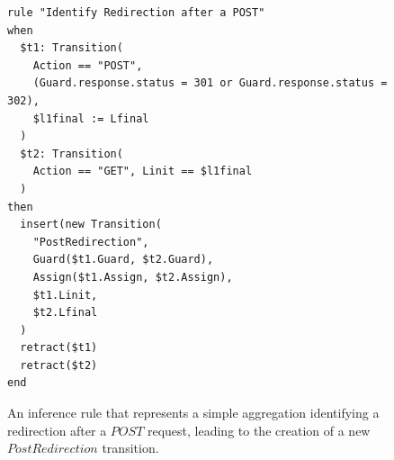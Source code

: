 \begin{figure}
\begin{framed}
\begin{BVerbatim}
rule "Identify Redirection after a POST"
when
  $t1: Transition(
    Action == "POST",
    (Guard.response.status = 301 or Guard.response.status = 302),
    $l1final := Lfinal
  )
  $t2: Transition(
    Action == "GET", Linit == $l1final
  )
then
  insert(new Transition(
    "PostRedirection",
    Guard($t1.Guard, $t2.Guard),
    Assign($t1.Assign, $t2.Assign),
    $t1.Linit,
    $t2.Lfinal
  )
  retract($t1)
  retract($t2)
end
\end{BVerbatim}
\end{framed}

\caption{An inference rule that represents a simple aggregation
identifying a redirection after a $POST$ request, leading to the
creation of a new $PostRedirection$ transition.}
\label{fig:rule:redirect}
\end{figure}


